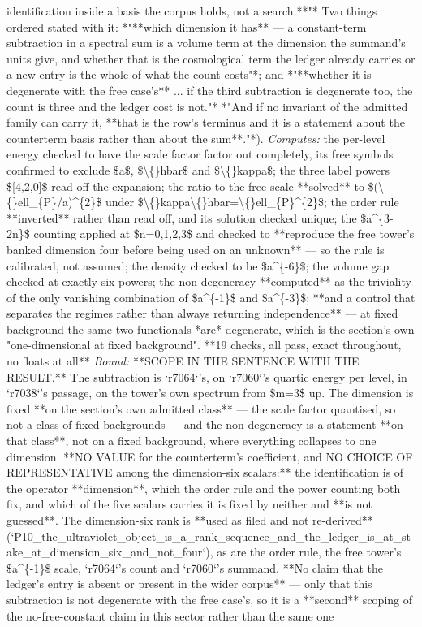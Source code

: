 \begin{description}
identification inside a basis the corpus holds, not a search.**"*  Two things ordered stated with it: *"**which dimension it has** --- a constant-term subtraction in a spectral sum is a volume term at the dimension the summand's units give, and whether that is the cosmological term the ledger already carries or a new entry is the whole of what the count costs"*; and *"**whether it is degenerate with the free case's** ... if the third subtraction is degenerate too, the count is three and the ledger cost is not."*  *"And if no invariant of the admitted family can carry it, **that is the row's terminus and it is a statement about the counterterm basis rather than about the sum**."*). 
\emph{Computes:} the per-level energy checked to have the scale factor factor out completely, its free symbols confirmed to exclude \$a\$, \$\textbackslash\{\}hbar\$ and \$\textbackslash\{\}kappa\$; the three label powers \$[4,2,0]\$ read off the expansion; the ratio to the free scale **solved** to \$(\textbackslash\{\}ell\_\{P\}/a)\textasciicircum{}\{2\}\$ under \$\textbackslash\{\}kappa\textbackslash\{\}hbar=\textbackslash\{\}ell\_\{P\}\textasciicircum{}\{2\}\$; the order rule **inverted** rather than read off, and its solution checked unique; the \$a\textasciicircum{}\{3-2n\}\$ counting applied at \$n=0,1,2,3\$ and checked to **reproduce the free tower's banked dimension four before being used on an unknown** --- so the rule is calibrated, not assumed; the density checked to be \$a\textasciicircum{}\{-6\}\$; the volume gap checked at exactly six powers; the non-degeneracy **computed** as the triviality of the only vanishing combination of \$a\textasciicircum{}\{-1\}\$ and \$a\textasciicircum{}\{-3\}\$; **and a control that separates the regimes rather than always returning independence** --- at fixed background the same two functionals *are* degenerate, which is the section's own "one-dimensional at fixed background". **19 checks, all pass, exact throughout, no floats at all**
 \emph{Bound:}  **SCOPE IN THE SENTENCE WITH THE RESULT.** The subtraction is `r7064`'s, on `r7060`'s quartic energy per level, in `r7038`'s passage, on the tower's own spectrum from \$m=3\$ up. The dimension is fixed **on the section's own admitted class** --- the scale factor quantised, so not a class of fixed backgrounds --- and the non-degeneracy is a statement **on that class**, not on a fixed background, where everything collapses to one dimension.  **NO VALUE for the counterterm's coefficient, and NO CHOICE OF REPRESENTATIVE among the dimension-six scalars:** the identification is of the operator **dimension**, which the order rule and the power counting both fix, and which of the five scalars carries it is fixed by neither and **is not guessed**. The dimension-six rank is **used as filed and not re-derived** (`P10\_the\_ultraviolet\_object\_is\_a\_rank\_sequence\_and\_the\_ledger\_is\_at\_stake\_at\_dimension\_six\_and\_not\_four`), as are the order rule, the free tower's \$a\textasciicircum{}\{-1\}\$ scale, `r7064`'s count and `r7060`'s summand. **No claim that the ledger's entry is absent or present in the wider corpus** --- only that this subtraction is not degenerate with the free case's, so it is a **second** scoping of the no-free-constant claim in this sector rather than the same one

\end{description}
